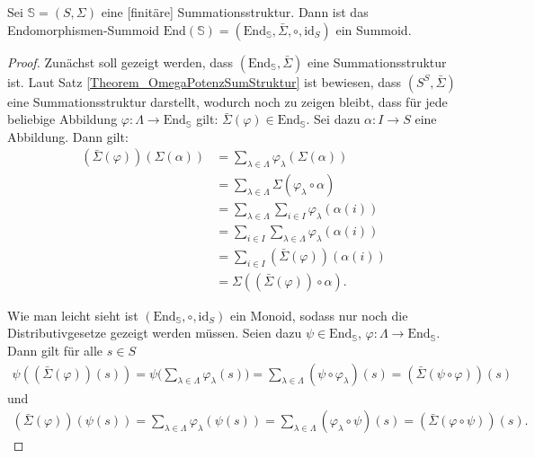 \documentclass{article}
\begin{document}
\begin{theorem}\label{Theorem_SummationEndomorphismus}
  Sei $\mathbb{S} = (S, \Sigma)$ eine [finitäre] Summationsstruktur.
  Dann ist das Endomorphismen-Summoid $\text{End}(\mathbb{S}) = (\text{End}_\mathbb{S}, \bar\Sigma, \circ, \text{id}_S)$ ein Summoid.
\end{theorem}
\begin{proof}
  Zunächst soll gezeigt werden, dass $(\text{End}_\mathbb{S}, \bar\Sigma)$ eine Summationsstruktur ist.
  Laut Satz \ref{Theorem_OmegaPotenzSumStruktur} ist bewiesen, dass $(S^S, \bar\Sigma)$ eine Summationsstruktur darstellt,
  wodurch noch zu zeigen bleibt, dass für jede beliebige Abbildung $\varphi \colon \Lambda \to \text{End}_\mathbb{S}$
  gilt: $\bar\Sigma(\varphi) \in \text{End}_\mathbb{S}$. 
  Sei dazu $\alpha \colon I \to S$ eine Abbildung.
  Dann gilt:
  \begin{align*}
    (\bar\Sigma(\varphi))(\Sigma(\alpha)) 
    &= \sum_{\lambda \in \Lambda}\varphi_\lambda(\Sigma(\alpha)) \\
    &= \sum_{\lambda \in \Lambda}\Sigma(\varphi_\lambda \circ \alpha) \\ 
    &= \sum_{\lambda \in \Lambda}\sum_{i \in I}\varphi_\lambda(\alpha(i)) \\
    &= \sum_{i \in I}\sum_{\lambda \in \Lambda}\varphi_\lambda(\alpha(i)) \\
    &= \sum_{i \in I}(\bar\Sigma(\varphi))(\alpha(i)) \\
    &= \Sigma((\bar\Sigma(\varphi)) \circ \alpha).
  \end{align*}

  Wie man leicht sieht ist $(\text{End}_\mathbb{S}, \circ, \text{id}_S)$ ein Monoid, 
  sodass nur noch die Distributivgesetze gezeigt werden müssen.
  Seien dazu $\psi \in \text{End}_\mathbb{S}$, $\varphi \colon \Lambda \to \text{End}_\mathbb{S}$.
  Dann gilt für alle $s \in S$
  \begin{align*}
    \psi((\bar\Sigma(\varphi))(s))
    = \psi \bigg(\sum_{\lambda \in \Lambda}\varphi_\lambda(s) \bigg)
    = \sum_{\lambda \in \Lambda}(\psi \circ \varphi_\lambda)(s)
    = (\bar\Sigma(\psi \circ \varphi))(s)
  \end{align*}
  und
  \begin{align*}
    (\bar\Sigma(\varphi))(\psi(s))
    = \sum_{\lambda \in \Lambda}\varphi_\lambda(\psi(s))
    = \sum_{\lambda \in \Lambda}(\varphi_\lambda \circ \psi)(s)
    = (\bar\Sigma(\varphi\circ \psi))(s).
  \end{align*}
\end{proof}
\end{document}
